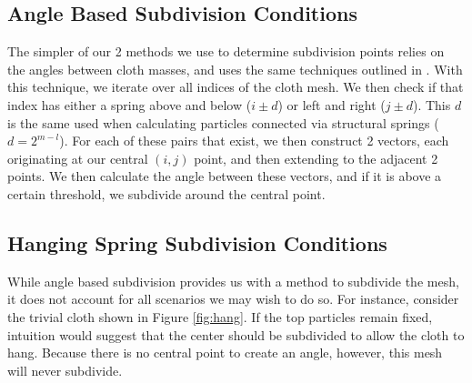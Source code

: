 \documentclass[sigconf]{acmart}
\begin{document}
\subsection{Angle Based Subdivision Conditions}
The simpler of our 2 methods we use to determine subdivision points relies on the angles between cloth masses, and uses the same techniques outlined in \cite{hutchinson}. With this technique, we iterate over all indices of the cloth mesh. We then check if that index has either a spring above and below ($i\pm d$) or left and right ($j\pm d$). This $d$ is the same used when calculating particles connected via structural springs ($d=2^{m-l}$). For each of these pairs that exist, we then construct 2 vectors, each originating at our central $(i,j)$ point, and then extending to the adjacent 2 points. We then calculate the angle between these vectors, and if it is above a certain threshold, we subdivide around the central point. 
\subsection{Hanging Spring Subdivision Conditions}
While angle based subdivision provides us with a method to subdivide the mesh, it does not account for all scenarios we may wish to do so. For instance, consider the trivial cloth shown in Figure \ref{fig:hang}. If the top particles remain fixed, intuition would suggest that the center should be subdivided to allow the cloth to hang. Because there is no central point to create an angle, however, this mesh will never subdivide. 
\end{document}
